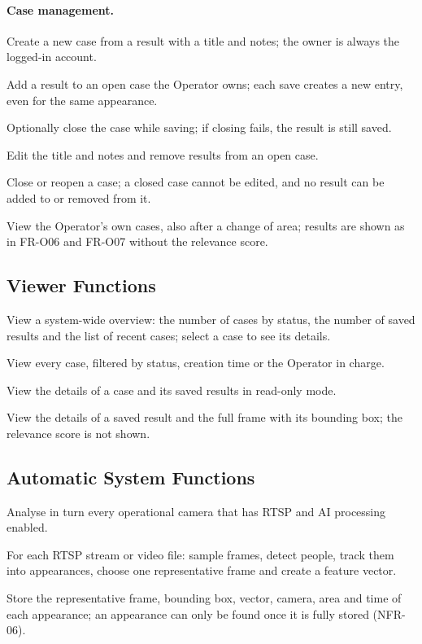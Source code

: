 \paragraph{Case management.}
\begin{reqlist}
    \item[FR-O09] Create a new case from a result with a title and notes; the owner is always the logged-in account.
    \item[FR-O10] Add a result to an open case the Operator owns; each save creates a new entry, even for the same appearance.
    \item[FR-O11] Optionally close the case while saving; if closing fails, the result is still saved.
    \item[FR-O12] Edit the title and notes and remove results from an open case.
    \item[FR-O13] Close or reopen a case; a closed case cannot be edited, and no result can be added to or removed from it.
    \item[FR-O14] View the Operator's own cases, also after a change of area; results are shown as in FR-O06 and FR-O07 without the relevance score.
\end{reqlist}

\subsection{Viewer Functions}
\label{sec:4.2.4}

\begin{reqlist}
    \item[FR-V01] View a system-wide overview: the number of cases by status, the number of saved results and the list of recent cases; select a case to see its details.
    \item[FR-V02] View every case, filtered by status, creation time or the Operator in charge.
    \item[FR-V03] View the details of a case and its saved results in read-only mode.
    \item[FR-V04] View the details of a saved result and the full frame with its bounding box; the relevance score is not shown.
\end{reqlist}

\subsection{Automatic System Functions}
\label{sec:4.2.5}

\begin{reqlist}
    \item[FR-S01] Analyse in turn every operational camera that has RTSP and AI processing enabled.
    \item[FR-S02] For each RTSP stream or video file: sample frames, detect people, track them into appearances, choose one representative frame and create a feature vector.
    \item[FR-S03] Store the representative frame, bounding box, vector, camera, area and time of each appearance; an appearance can only be found once it is fully stored (NFR-06).
\end{reqlist}
